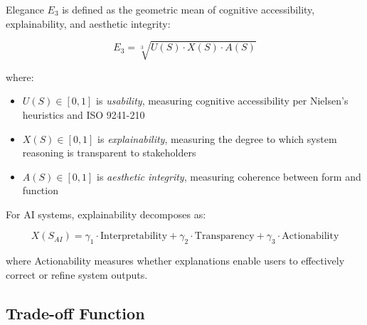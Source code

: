 \begin{definition}[Elegance]
\label{def:elegance}
Elegance $E_3$ is defined as the geometric mean of cognitive accessibility, explainability, and aesthetic integrity:

\begin{equation}
E_3 = \sqrt[3]{U(S) \cdot X(S) \cdot A(S)}
\end{equation}

where:
\begin{itemize}[leftmargin=2em]
    \item $U(S) \in [0,1]$ is \emph{usability}, measuring cognitive accessibility per Nielsen's heuristics \cite{nielsen1994enhancing} and ISO 9241-210 \cite{iso2019ergonomics}
    \item $X(S) \in [0,1]$ is \emph{explainability}, measuring the degree to which system reasoning is transparent to stakeholders \cite{doshivelez2017towards, ribeiro2016should}
    \item $A(S) \in [0,1]$ is \emph{aesthetic integrity}, measuring coherence between form and function
\end{itemize}

For AI systems, explainability decomposes as:

\begin{equation}
X(S_{AI}) = \gamma_1 \cdot \text{Interpretability} + \gamma_2 \cdot \text{Transparency} + \gamma_3 \cdot \text{Actionability}
\end{equation}

where Actionability measures whether explanations enable users to effectively correct or refine system outputs.
\end{definition}

\subsection{Trade-off Function}

